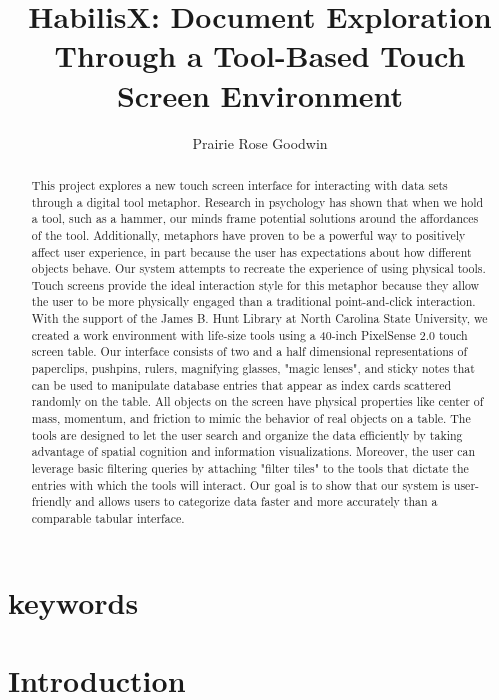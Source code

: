 \documentclass{article}
\begin{document}
\title{HabilisX: Document Exploration Through a Tool-Based Touch Screen Environment }
\author{Prairie Rose Goodwin}
\date{}
\maketitle
\begin{abstract}
This project explores a new touch screen interface for interacting with data sets through a digital tool metaphor.  Research in psychology has shown that when we hold a tool, such as a hammer, our minds frame potential solutions around the affordances of the tool.  Additionally, metaphors have proven to be a powerful way to positively affect user experience, in part because the user has expectations about how different objects behave.  Our system attempts to recreate the experience of using physical tools. Touch screens provide the ideal interaction style for this metaphor because they allow the user to be more physically engaged than a traditional point-and-click interaction. With the support of the James B. Hunt Library at North Carolina State University, we created a work environment with life-size tools using a 40-inch PixelSense 2.0 touch screen table.  Our interface consists of two and a half dimensional representations of paperclips, pushpins, rulers, magnifying glasses, "magic lenses", and sticky notes that can be used to manipulate database entries that appear as index cards scattered randomly on the table.  All objects on the screen have physical properties like center of mass, momentum, and friction to mimic the behavior of real objects on a table.  The tools are designed to let the user search and organize the data efficiently by taking advantage of spatial cognition and information visualizations.  Moreover, the user can leverage basic filtering queries by attaching "filter tiles" to the tools that dictate the entries with which the tools will interact.  Our goal is to show that our system is user-friendly and allows users to categorize data faster and more accurately than a comparable tabular interface.
\end{abstract}
\section{keywords}


\section{Introduction}	
\end{document}
